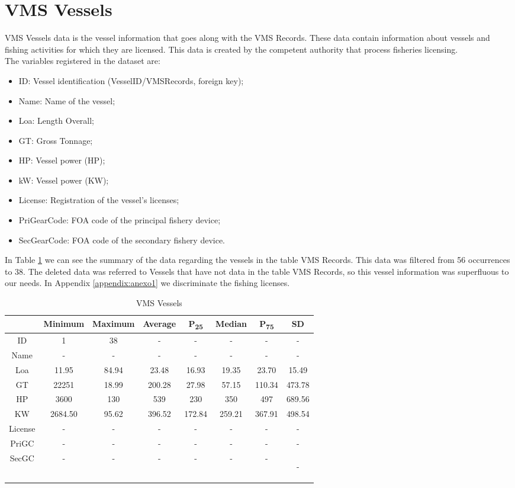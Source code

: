 \section{VMS Vessels} %
\label{sub:vms_vessels}
VMS Vessels data is the vessel information that goes along with the VMS Records. These data contain information about vessels and fishing activities for which they are licensed. This data is created by the competent authority that process fisheries licensing. \\
The variables registered in the dataset are:
\begin{itemize}
\item ID: Vessel identification (VesselID/VMSRecords, foreign key);
\item Name: Name of the vessel;
\item Loa: Length Overall; 
\item GT: Gross Tonnage;
\item HP: Vessel power (HP);
\item kW: Vessel power (KW);
\item License: Registration of the vessel's licenses;
\item PriGearCode: FOA code of the principal fishery device;
\item SecGearCode: FOA code of the secondary fishery device.
\end{itemize}

In Table \ref{table:vms_vessels} we can see the summary of the data regarding the vessels in the table VMS Records. This data was filtered from 56 occurrences to 38. The deleted data was referred to Vessels that have not data in the table VMS Records, so this vessel information was superfluous to our needs. In Appendix \ref{appendix:anexo1} we discriminate the fishing licenses. 


\begin {table}[H]
\small
\begin{center}
\begin{tabular}{c|c|c|c|c|c|c|c}
& Minimum & Maximum & Average & P\textsubscript{25} & Median & P\textsubscript{75} & SD \\
\hline
ID & 1&38&-&-&-&-&-\\
Name &-&-&-&-&-&-&-\\
Loa & 11.95&84.94&23.48&16.93&19.35&23.70&15.49\\
GT &22251&18.99&200.28&27.98&57.15&110.34&473.78\\
HP & 3600&130&539&230&350&497&689.56\\
KW &2684.50&95.62&396.52&172.84&259.21&367.91&498.54\\
License &-&-&-&-&-&-&-\\
PriGC &-&-&-&-&-&-&-\\
SecGC &-&-&-&-&-&-&-


\label{table:vms_vessels}
\end{tabular}
\caption {VMS Vessels}
\end{center}
\end {table}


